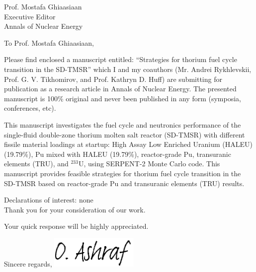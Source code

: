 \documentclass[11pt]{letter} %
\newcommand{\RecipientName}{Prof. Mostafa Ghiaasiaan\xspace}
\newcommand{\RecipientAddress}{Executive Editor\\Annals of Nuclear Energy}
\begin{document}
	\begin{letter}{\RecipientName\\
			\RecipientAddress\xspace}
		
		\address{O. Ashraf\\
			oabdelaziz@mephi.ru\\
			osama.ashraf@edu.asu.edu.eg\\
			Institute of Nuc. Physics and Eng.\\
			National Research Nuclear University\\
			Moscow, Russia, 115409}
		
		
		\opening{To \RecipientName,}
		
		Please find enclosed a manuscript entitled: ``Strategies for thorium fuel cycle transition in the SD-TMSR'' which I and my coauthors (Mr. Andrei Rykhlevskii, Prof. G. V. Tikhomirov, 
		and Prof. Kathryn D. Huff) are submitting for publication as a research article 
		in Annals of Nuclear Energy. The presented manuscript is 100\% original and never been published in any form (symposia, conferences, etc). 
		
		This manuscript investigates the fuel cycle and neutronics performance of the single-fluid double-zone thorium molten salt reactor (SD-TMSR) with different fissile material loadings at startup: High Assay Low Enriched Uranium (HALEU) (19.79\%), Pu mixed with HALEU (19.79\%), reactor-grade Pu, transuranic elements (TRU), and $^{233}$U, using SERPENT-2 Monte Carlo code. This manuscript provides feasible strategies for thorium fuel cycle transition in the SD-TMSR based on reactor-grade Pu and transuranic elements (TRU) results.
		
		Declarations of interest: none\\
		
		Thank you for your consideration of our work.
		
		Your quick response will be highly appreciated.
		
		\closing{Sincere regards,
			\includegraphics[height=1.5cm]{signature.png}\\
		}
		
		
	\end{letter}
	
\end{document}
